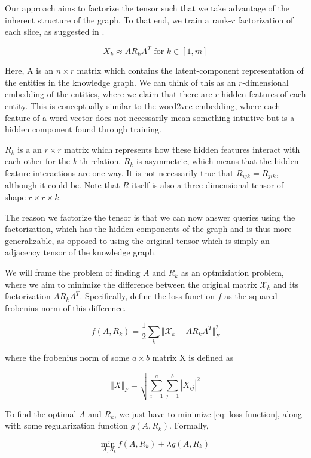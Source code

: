 \documentclass[pageno]{jpaper}
\begin{document}
Our approach aims to factorize the tensor such that we take advantage of the
inherent structure of the graph. To that end, we train a rank-$r$ factorization
of each slice, as suggested in \cite{Bader2007, Nickel2011}.

$$X_k \approx A R_k A^T \text{ for } k \in [1,m]$$

Here, A is an $n\times r$ matrix which contains the latent-component representation
of the entities in the knowledge graph. We can think of this as an $r$-dimensional
embedding of the entities, where we claim that there are $r$ hidden features of
each entity. This is conceptually similar to the word2vec embedding, where each
feature of a word vector does not necessarily mean something intuitive but is a
hidden component found through training.

$R_k$ is a an $r\times r$ matrix which represents how these hidden features
interact with each other for the $k$-th relation. $R_k$ is asymmetric, which
means that the hidden feature interactions are one-way. It is not necessarily
true that $R_{ijk} = R_{jik}$, although it could be. Note that $R$ itself is
also a three-dimensional tensor of shape $r\times r\times k$.

The reason we factorize the tensor is that we can now answer queries using the factorization,
which has the hidden components of the graph and is thus more generalizable, as
opposed to using the original tensor which is simply an adjacency tensor of the
knowledge graph.

We will frame the problem of finding $A$ and $R_k$ as an optmiziation problem,
where we aim to minimize the difference between the original matrix
$\mathcal{X}_k$ and its factorization $AR_kA^T$. Specifically, define the loss
function $f$ as the squared frobenius norm of this difference.

\begin{equation}
\label{eq: loss function}
    f(A, R_k) = \dfrac{1}{2} \sum_k \Vert \mathcal{X}_k - AR_kA^T \Vert _F^2
\end{equation}

where the frobenius norm of some $a\times b$ matrix X is defined as

$$\Vert X \Vert_F = \sqrt{\sum_{i=1}^a \sum_{j=1}^b |X_{ij}|^2}$$

To find the optimal $A$ and $R_k$, we just have to minimize \ref{eq: loss
function}, along with some regularization function $g(A, R_k)$. Formally,

\begin{equation}
    \label{eq: to minimize}
    \underset{A, R_k}{\text{min }} f(A,R_k) + \lambda g(A, R_k)
\end{equation}
\end{document}
